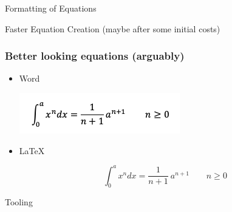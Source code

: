 \documentclass{beamer}
\begin{document}
\begin{frame}{Formatting of Equations}


\vskip 1cm

\end{frame}

\begin{frame}{Faster Equation Creation (maybe after some initial costs)}


\end{frame}

\begin{frame}[fragile]
  \frametitle{Better looking equations (arguably)}

  \begin{itemize}

  \item{Word}

  \includegraphics[scale=.75]{word-equation.png}

  \item{\LaTeX}

  \begin{equation}
  \int_0^a x^n dx = \frac{1}{n+1}\
  a^{n+1} \qquad n \geq 0
  \end{equation}

  \end{itemize}

\end{frame}


\begin{frame}{Tooling}

\end{frame}
\end{document}
